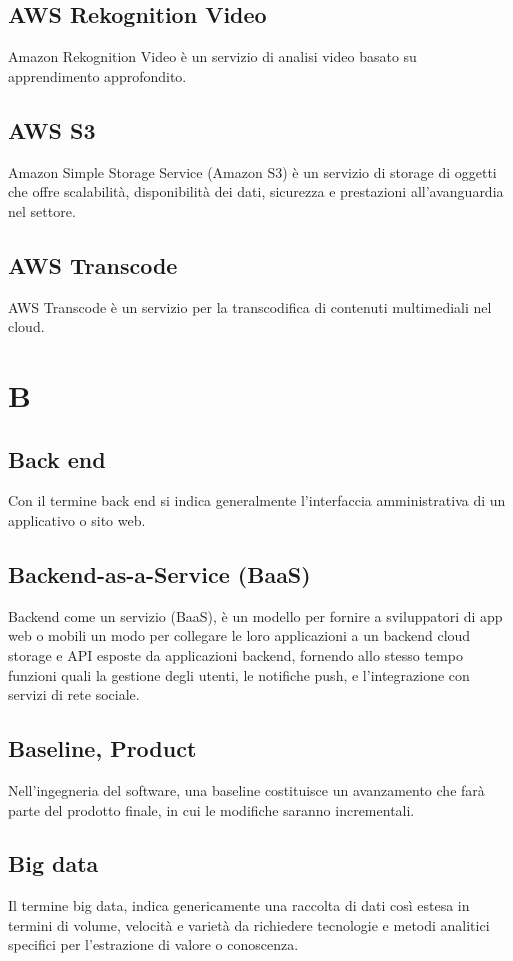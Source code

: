 \subsection{AWS Rekognition Video}  Amazon Rekognition Video è un servizio di analisi video basato su apprendimento approfondito.
\subsection{AWS S3}  Amazon Simple Storage Service (Amazon S3) è un servizio di storage di oggetti che offre scalabilità, disponibilità dei dati, sicurezza e prestazioni all'avanguardia nel settore.
\subsection{AWS Transcode}  AWS Transcode è un servizio per la transcodifica di contenuti multimediali nel cloud.

\newpage \section{B}
\subsection{Back end}  Con il termine back end si indica generalmente l'interfaccia amministrativa di un applicativo o sito web.
\subsection{Backend-as-a-Service (BaaS)}  Backend come un servizio (BaaS), è un modello per fornire a sviluppatori di app web o mobili un modo per collegare le loro applicazioni a un backend cloud storage e API esposte da applicazioni backend, fornendo allo stesso tempo funzioni quali la gestione degli utenti, le notifiche push, e l'integrazione con servizi di rete sociale.
\subsection{Baseline, Product}  Nell'ingegneria del software, una baseline costituisce un avanzamento che farà parte del prodotto finale, in cui le modifiche saranno incrementali.
\subsection{Big data}  Il termine big data, indica genericamente una raccolta di dati così estesa in termini di volume, velocità e varietà da richiedere tecnologie e metodi analitici specifici per l'estrazione di valore o conoscenza.
